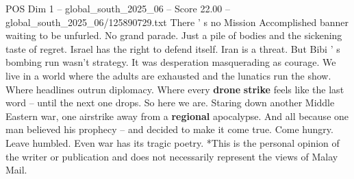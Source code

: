 \begin{textsample}{POS Dim 1 – global\_south\_2025\_06 – Score 22.00 – global\_south\_2025\_06/125890729.txt}
There ' s no Mission Accomplished banner waiting to be unfurled.
No grand parade.
Just a pile of bodies and the sickening taste of regret.
Israel has the right to defend itself.
Iran is a threat.
But Bibi ' s bombing run wasn't strategy.
It was desperation masquerading as courage.
We live in a world where the adults are exhausted and the lunatics run the show.
Where headlines outrun diplomacy.
Where every \textbf{drone} \textbf{strike} feels like the last word -- until the next one drops.
So here we are.
Staring down another Middle Eastern war, one airstrike away from a \textbf{regional} apocalypse.
And all because one man believed his prophecy -- and decided to make it come true.
Come hungry.
Leave humbled.
Even war has its tragic poetry. *This is the personal opinion of the writer or publication and does not necessarily represent the views of Malay Mail.

\end{textsample}
